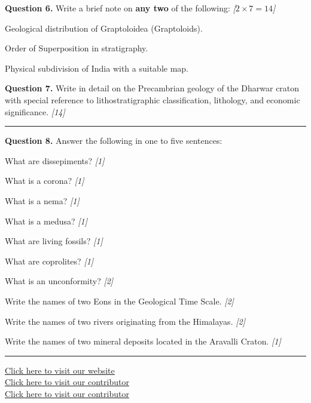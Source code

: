 \documentclass[11pt,a4paper]{article}
\newcommand{\pts}[1]{\hfill   \textit{[#1]}}
\begin{document}
\medskip


\noindent   \textbf{Question 6.} Write a brief note on   \textbf{any two} of the following: \pts{$2  \times 7 = 14$}

\begin{parts}
  \item Geological distribution of Graptoloidea (Graptoloids).
  \item Order of Superposition in stratigraphy.
  \item Physical subdivision of India with a suitable map.
\end{parts}

\medskip


\noindent   \textbf{Question 7.} Write in detail on the Precambrian geology of the Dharwar craton with special reference to lithostratigraphic classification, lithology, and economic significance. \pts{14}

\bigskip


\rule{\linewidth}{0.4pt}\smallskip




\noindent   \textbf{Question 8.} Answer the following in one to five sentences:

\begin{parts}
  \item What are dissepiments? \pts{1}
  \item What is a corona? \pts{1}
  \item What is a nema? \pts{1}
  \item What is a medusa? \pts{1}
  \item What are living fossils? \pts{1}
  \item What are coprolites? \pts{1}
  \item What is an unconformity? \pts{2}
  \item Write the names of two Eons in the Geological Time Scale. \pts{2}
  \item Write the names of two rivers originating from the Himalayas. \pts{2}
  \item Write the names of two mineral deposits located in the Aravalli Craton. \pts{1}
\end{parts}

\vfill\rule{\linewidth}{0.4pt}

\begin{center}\small
\href{https://bhu-exam.vercel.app/}{Click here to visit our website}\\[4pt]
\href{https://me-aryan.vercel.app/}{Click here to visit our contributor}\\[4pt]
\href{https://quashan-me.vercel.app/}{Click here to visit our contributor}
\end{center}
\end{document}
